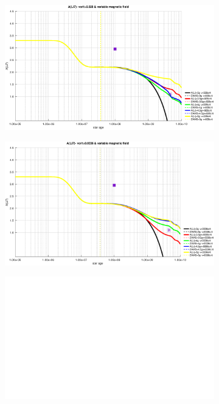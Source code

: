 \documentclass[fleqn,usenatbib]{mnras}
\begin{document}
\begin{figure}
\begin{subfigure}[h]{0.47\textwidth}
    \label{fig:subim23}
    \end{subfigure}
    \begin{subfigure}[h]{0.47\textwidth}
    \includegraphics[width=\textwidth]{figures/li_vc_028_var_b.eps}
    \label{fig:subim24}
    \end{subfigure}
    \begin{subfigure}[h]{0.47\textwidth}
    \includegraphics[width=\textwidth]{figures/li_vc_0336_var_b.eps}
    \label{fig:subim25}
    \end{subfigure}
    \begin{subfigure}[h]{0.47\textwidth}
    \includegraphics[width=\textwidth]{figures/blank.eps}

\end{subfigure}
\end{figure}
\end{document}

